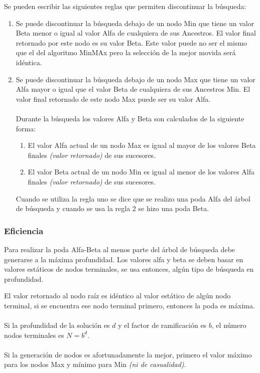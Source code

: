 Se pueden escribir las siguientes reglas que permiten discontinuar la búsqueda:
\begin{enumerate}
	\item Se puede discontinuar la búsqueda debajo de un nodo Min que tiene un valor Beta menor o igual al valor Alfa de cualquiera de sus Ancestros. El valor final retornado por este nodo es su valor Beta. Este valor puede no ser el mismo que el del algoritmo MinMAx pero la selección de la mejor movida será idéntica.

	\item Se puede discontinuar la búsqueda debajo de un nodo Max que tiene un valor Alfa mayor o igual que el valor Beta de cualquiera de sus Ancestros Min. El valor final retornado de este nodo Max puede ser su valor Alfa.
	      \\\\
	      Durante la búsqueda los valores Alfa y Beta son calculados de la siguiente forma:
	      \begin{enumerate}
		      \item El valor Alfa actual de un nodo Max es igual al mayor de los valores Beta finales \textit{(valor retornado)} de sus sucesores.
		      \item El valor Beta actual de un nodo Min es igual al menor de los valores Alfa finales \textit{(valor retornado)} de sus sucesores.
	      \end{enumerate}
	      \vspace{10pt}
	      Cuando se utiliza la regla uno se dice que se realizo una poda Alfa del árbol de búsqueda y cuando se usa la regla 2 se hizo una poda Beta.
\end{enumerate}

\subsubsection{Eficiencia}
Para realizar la poda Alfa-Beta al menos parte del árbol de búsqueda debe generarse a la máxima profundidad. Los valores alfa y beta se deben basar en valores estáticos de nodos terminales, se usa entonces, algún tipo de búsqueda en profundidad.

El valor retornado al nodo raíz es idéntico al valor estático de algún nodo terminal, si se encuentra ese nodo terminal primero, entonces la poda es máxima.
\\\\
Si la profundidad de la solución es $d$ y el factor de ramificación es $b$, el número nodos terminales es $N=b^d$.
\\\\
Si la generación de nodos es afortunadamente la mejor, primero el valor máximo para los nodos Max y mínimo para Min \textit{(ni de casualidad)}.

